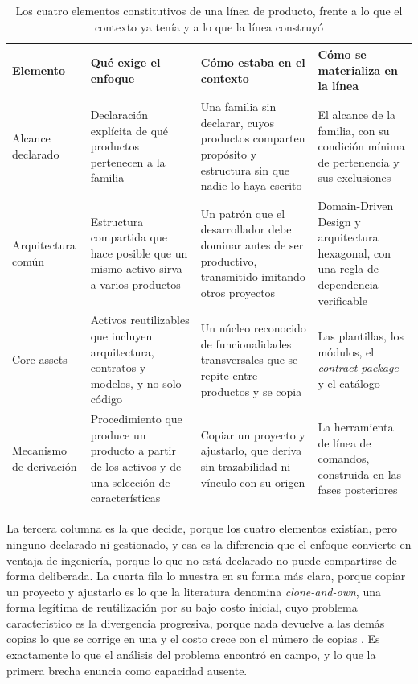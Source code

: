 \begin{table}[H]
\centering
{\footnotesize
\begin{tabular}{p{2.5cm}p{3.9cm}p{4.3cm}p{3.8cm}}
\toprule
\textbf{Elemento} & \textbf{Qué exige el enfoque} & \textbf{Cómo estaba en el contexto} & \textbf{Cómo se materializa en la línea} \\
\midrule
Alcance declarado & Declaración explícita de qué productos pertenecen a la familia & Una familia sin declarar, cuyos productos comparten propósito y estructura sin que nadie lo haya escrito & El alcance de la familia, con su condición mínima de pertenencia y sus exclusiones \\
Arquitectura común & Estructura compartida que hace posible que un mismo activo sirva a varios productos & Un patrón que el desarrollador debe dominar antes de ser productivo, transmitido imitando otros proyectos & Domain-Driven Design y arquitectura hexagonal, con una regla de dependencia verificable \\
Core assets & Activos reutilizables que incluyen arquitectura, contratos y modelos, y no solo código & Un núcleo reconocido de funcionalidades transversales que se repite entre productos y se copia & Las plantillas, los módulos, el \emph{contract package} y el catálogo \\
Mecanismo de derivación & Procedimiento que produce un producto a partir de los activos y de una selección de características & Copiar un proyecto y ajustarlo, que deriva sin trazabilidad ni vínculo con su origen & La herramienta de línea de comandos, construida en las fases posteriores \\
\bottomrule
\end{tabular}
}
\caption{Los cuatro elementos constitutivos de una línea de producto, frente a lo que el contexto ya tenía y a lo que la línea construyó}
\label{tab:constitutivos}
\end{table}

La tercera columna es la que decide, porque los cuatro elementos existían,
pero ninguno declarado ni gestionado, y esa es la diferencia que el enfoque
convierte en ventaja de ingeniería, porque lo que no está declarado no puede
compartirse de forma deliberada. La cuarta fila lo muestra en su forma más
clara, porque copiar un proyecto y ajustarlo es lo que la literatura denomina
\emph{clone-and-own}, una forma legítima de reutilización por su bajo costo
inicial, cuyo problema característico es la divergencia progresiva, porque
nada devuelve a las demás copias lo que se corrige en una y el costo crece con
el número de copias \citep{Dubinsky2013}. Es exactamente lo que el análisis
del problema encontró en campo, y lo que la primera brecha enuncia como
capacidad ausente.

